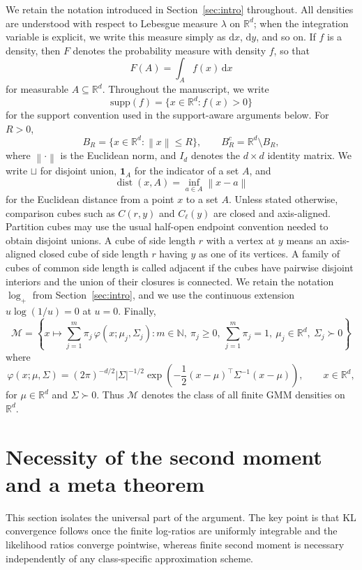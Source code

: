 \documentclass[11pt]{article}
\theoremstyle{definition}
\begin{document}
We retain the notation introduced in Section~\ref{sec:intro} throughout. All densities are understood with respect to Lebesgue measure $\lambda$ on $\mathbb{R}^d$; when the integration variable is explicit, we write this measure simply as $\mathrm{d}x$, $\mathrm{d}y$, and so on. If $f$ is a density, then $F$ denotes the probability measure with density $f$, so that
\[
F(A)=\int_A f(x)\,\mathrm{d}x
\]
for measurable $A\subseteq\mathbb{R}^d$. Throughout the manuscript, we write
\[
\mathrm{supp}(f)=\{x\in\mathbb{R}^d:f(x)>0\}
\]
for the support convention used in the support-aware arguments below. For $R>0$,
\[
B_R=\{x\in\mathbb{R}^d:\left\lVert x\right\rVert\le R\},
\qquad
B_R^c=\mathbb{R}^d\setminus B_R,
\]
where $\left\lVert\cdot\right\rVert$ is the Euclidean norm, and $I_d$ denotes the $d\times d$ identity matrix. We write $\sqcup$ for disjoint union, $\mathbf{1}_A$ for the indicator of a set $A$, and
\[
\operatorname{dist}(x,A)=\inf_{a\in A}\left\lVert x-a\right\rVert
\]
for the Euclidean distance from a point $x$ to a set $A$. Unless stated otherwise, comparison cubes such as $C(r,y)$ and $C_\ell(y)$ are closed and axis-aligned. Partition cubes may use the usual half-open endpoint convention needed to obtain disjoint unions. A cube of side length $r$ with a vertex at $y$ means an axis-aligned closed cube of side length $r$ having $y$ as one of its vertices. A family of cubes of common side length is called adjacent if the cubes have pairwise disjoint interiors and the union of their closures is connected. We retain the notation $\log_+$ from Section~\ref{sec:intro}, and we use the continuous extension $u\log\!\left(1/u\right)=0$ at $u=0$. Finally,
\[
\mathcal M=
\left\{
x\mapsto \sum_{j=1}^m \pi_j\,\varphi(x;\mu_j,\Sigma_j):
m\in\mathbb N,\ 
\pi_j\ge0,\ 
\sum_{j=1}^m \pi_j=1,\ 
\mu_j\in\mathbb{R}^d,\ 
\Sigma_j\succ0
\right\}
\]
where
\[
\varphi(x;\mu,\Sigma)
=
(2\pi)^{-d/2}|\Sigma|^{-1/2}
\exp\!\left(-\frac12 (x-\mu)^\top \Sigma^{-1}(x-\mu)\right),
\qquad x\in\mathbb{R}^d,
\]
for $\mu\in\mathbb{R}^d$ and $\Sigma\succ0$. Thus $\mathcal M$ denotes the class of all finite GMM densities on $\mathbb{R}^d$.

\section{Necessity of the second moment and a meta theorem}\label{sec:meta}

This section isolates the universal part of the argument. The key point is that KL convergence follows once the finite log-ratios are uniformly integrable and the likelihood ratios converge pointwise, whereas finite second moment is necessary independently of any class-specific approximation scheme.
\end{document}
